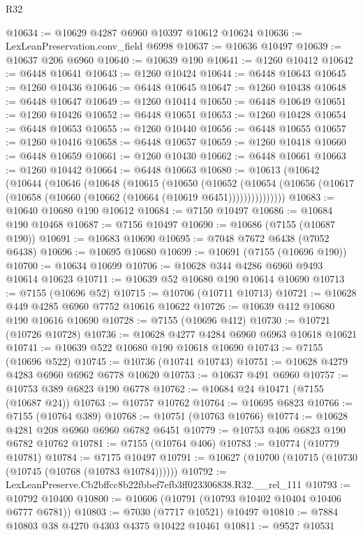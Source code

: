 \begin{lexlean}{R32}
\begin{coremodule}
@10634 := @10629 @4287 @6960 @10397 @10612 @10624
@10636 := LexLeanPreservation.conv_field @6998
@10637 := @10636 @10497
@10639 := @10637 @206 @6960
@10640 := @10639 @190
@10641 := @1260 @10412
@10642 := @6448 @10641
@10643 := @1260 @10424
@10644 := @6448 @10643
@10645 := @1260 @10436
@10646 := @6448 @10645
@10647 := @1260 @10438
@10648 := @6448 @10647
@10649 := @1260 @10414
@10650 := @6448 @10649
@10651 := @1260 @10426
@10652 := @6448 @10651
@10653 := @1260 @10428
@10654 := @6448 @10653
@10655 := @1260 @10440
@10656 := @6448 @10655
@10657 := @1260 @10416
@10658 := @6448 @10657
@10659 := @1260 @10418
@10660 := @6448 @10659
@10661 := @1260 @10430
@10662 := @6448 @10661
@10663 := @1260 @10442
@10664 := @6448 @10663
@10680 := @10613
    (@10642
      (@10644
        (@10646
          (@10648
            (@10615
              (@10650
                (@10652
                  (@10654
                    (@10656 (@10617 (@10658 (@10660 (@10662 (@10664 (@10619 @6451)))))))))))))))
@10683 := @10640 @10680 @190 @10612
@10684 := @7150 @10497
@10686 := @10684 @190 @10468
@10687 := @7156 @10497
@10690 := @10686 (@7155 (@10687 @190))
@10691 := @10683 @10690
@10695 := @7048 @7672 @6438 (@7052 @6438)
@10696 := @10695 @10680
@10699 := @10691 (@7155 (@10696 @190))
@10700 := @10634 @10699
@10706 := @10628 @344 @4286 @6960 @9493 @10614 @10623
@10711 := @10639 @52 @10680 @190 @10614 @10690
@10713 := @7155 (@10696 @52)
@10715 := @10706 (@10711 @10713)
@10721 := @10628 @449 @4285 @6960 @7752 @10616 @10622
@10726 := @10639 @412 @10680 @190 @10616 @10690
@10728 := @7155 (@10696 @412)
@10730 := @10721 (@10726 @10728)
@10736 := @10628 @4277 @4284 @6960 @6963 @10618 @10621
@10741 := @10639 @522 @10680 @190 @10618 @10690
@10743 := @7155 (@10696 @522)
@10745 := @10736 (@10741 @10743)
@10751 := @10628 @4279 @4283 @6960 @6962 @6778 @10620
@10753 := @10637 @491 @6960
@10757 := @10753 @389 @6823 @190 @6778
@10762 := @10684 @24 @10471 (@7155 (@10687 @24))
@10763 := @10757 @10762
@10764 := @10695 @6823
@10766 := @7155 (@10764 @389)
@10768 := @10751 (@10763 @10766)
@10774 := @10628 @4281 @208 @6960 @6960 @6782 @6451
@10779 := @10753 @406 @6823 @190 @6782 @10762
@10781 := @7155 (@10764 @406)
@10783 := @10774 (@10779 @10781)
@10784 := @7175 @10497
@10791 := @10627 (@10700 (@10715 (@10730 (@10745 (@10768 (@10783 @10784))))))
@10792 := LexLeanPreserve.Cb2bffcc8b22fbbef7efb3ff023306838.R32.__rel_111
@10793 := @10792 @10400
@10800 := @10606 (@10791 (@10793 @10402 @10404 @10406 @6777 @6781))
@10803 := @7030 (@7717 @10521) @10497
@10810 := @7884 @10803 @38 @4270 @4303 @4375 @10422 @10461
@10811 := @9527 @10531

\end{coremodule}
\end{lexlean}
